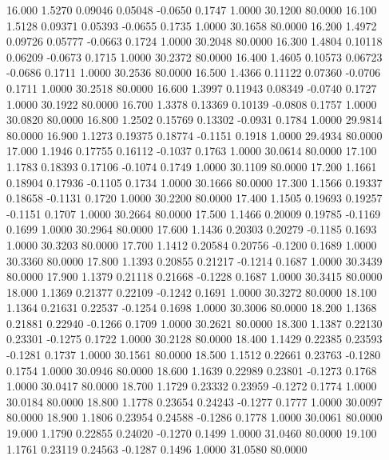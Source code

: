   16.000   1.5270   0.09046   0.05048  -0.0650   0.1747   1.0000  30.1200  80.0000
  16.100   1.5128   0.09371   0.05393  -0.0655   0.1735   1.0000  30.1658  80.0000
  16.200   1.4972   0.09726   0.05777  -0.0663   0.1724   1.0000  30.2048  80.0000
  16.300   1.4804   0.10118   0.06209  -0.0673   0.1715   1.0000  30.2372  80.0000
  16.400   1.4605   0.10573   0.06723  -0.0686   0.1711   1.0000  30.2536  80.0000
  16.500   1.4366   0.11122   0.07360  -0.0706   0.1711   1.0000  30.2518  80.0000
  16.600   1.3997   0.11943   0.08349  -0.0740   0.1727   1.0000  30.1922  80.0000
  16.700   1.3378   0.13369   0.10139  -0.0808   0.1757   1.0000  30.0820  80.0000
  16.800   1.2502   0.15769   0.13302  -0.0931   0.1784   1.0000  29.9814  80.0000
  16.900   1.1273   0.19375   0.18774  -0.1151   0.1918   1.0000  29.4934  80.0000
  17.000   1.1946   0.17755   0.16112  -0.1037   0.1763   1.0000  30.0614  80.0000
  17.100   1.1783   0.18393   0.17106  -0.1074   0.1749   1.0000  30.1109  80.0000
  17.200   1.1661   0.18904   0.17936  -0.1105   0.1734   1.0000  30.1666  80.0000
  17.300   1.1566   0.19337   0.18658  -0.1131   0.1720   1.0000  30.2200  80.0000
  17.400   1.1505   0.19693   0.19257  -0.1151   0.1707   1.0000  30.2664  80.0000
  17.500   1.1466   0.20009   0.19785  -0.1169   0.1699   1.0000  30.2964  80.0000
  17.600   1.1436   0.20303   0.20279  -0.1185   0.1693   1.0000  30.3203  80.0000
  17.700   1.1412   0.20584   0.20756  -0.1200   0.1689   1.0000  30.3360  80.0000
  17.800   1.1393   0.20855   0.21217  -0.1214   0.1687   1.0000  30.3439  80.0000
  17.900   1.1379   0.21118   0.21668  -0.1228   0.1687   1.0000  30.3415  80.0000
  18.000   1.1369   0.21377   0.22109  -0.1242   0.1691   1.0000  30.3272  80.0000
  18.100   1.1364   0.21631   0.22537  -0.1254   0.1698   1.0000  30.3006  80.0000
  18.200   1.1368   0.21881   0.22940  -0.1266   0.1709   1.0000  30.2621  80.0000
  18.300   1.1387   0.22130   0.23301  -0.1275   0.1722   1.0000  30.2128  80.0000
  18.400   1.1429   0.22385   0.23593  -0.1281   0.1737   1.0000  30.1561  80.0000
  18.500   1.1512   0.22661   0.23763  -0.1280   0.1754   1.0000  30.0946  80.0000
  18.600   1.1639   0.22989   0.23801  -0.1273   0.1768   1.0000  30.0417  80.0000
  18.700   1.1729   0.23332   0.23959  -0.1272   0.1774   1.0000  30.0184  80.0000
  18.800   1.1778   0.23654   0.24243  -0.1277   0.1777   1.0000  30.0097  80.0000
  18.900   1.1806   0.23954   0.24588  -0.1286   0.1778   1.0000  30.0061  80.0000
  19.000   1.1790   0.22855   0.24020  -0.1270   0.1499   1.0000  31.0460  80.0000
  19.100   1.1761   0.23119   0.24563  -0.1287   0.1496   1.0000  31.0580  80.0000
